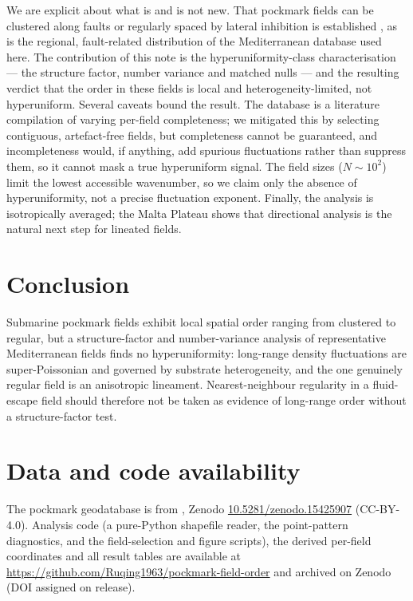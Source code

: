 \documentclass[11pt]{article}
\begin{document}
We are explicit about what is and is not new. That pockmark fields can be
clustered along faults or regularly spaced by lateral inhibition is established
\citep{hammer2009,spatola2025}, as is the regional, fault-related distribution of
the Mediterranean database used here. The contribution of this note is the
hyperuniformity-class characterisation --- the structure factor, number variance
and matched nulls --- and the resulting verdict that the order in these fields is
local and heterogeneity-limited, not hyperuniform. Several caveats bound the
result. The database is a literature compilation of varying per-field
completeness; we mitigated this by selecting contiguous, artefact-free fields,
but completeness cannot be guaranteed, and incompleteness would, if anything, add
spurious fluctuations rather than suppress them, so it cannot mask a true
hyperuniform signal. The field sizes ($N\sim10^2$) limit the lowest accessible
wavenumber, so we claim only the absence of hyperuniformity, not a precise
fluctuation exponent. Finally, the analysis is isotropically averaged; the Malta
Plateau shows that directional analysis is the natural next step for lineated
fields.

\section{Conclusion}

Submarine pockmark fields exhibit local spatial order ranging from clustered to
regular, but a structure-factor and number-variance analysis of representative
Mediterranean fields finds no hyperuniformity: long-range density fluctuations
are super-Poissonian and governed by substrate heterogeneity, and the one
genuinely regular field is an anisotropic lineament. Nearest-neighbour
regularity in a fluid-escape field should therefore not be taken as evidence of
long-range order without a structure-factor test.

\section*{Data and code availability}
The pockmark geodatabase is from \citet{spatola2025}, Zenodo
\href{https://doi.org/10.5281/zenodo.15425907}{10.5281/zenodo.15425907}
(CC-BY-4.0). Analysis code (a pure-Python shapefile reader, the point-pattern
diagnostics, and the field-selection and figure scripts), the derived per-field
coordinates and all result tables are available at
\url{https://github.com/Ruqing1963/pockmark-field-order} and archived on Zenodo
(DOI assigned on release).
\end{document}
